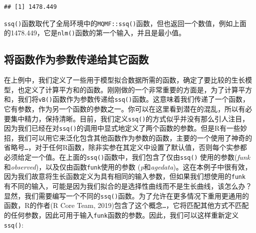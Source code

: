 \documentclass[
  lang=cn,
  11pt,
  scheme=chinese,
  chinesefont=nofont,
  citestyle=gb7714-2015,
  bibstyle=gb7714-2015]{elegantbook}
\newenvironment{Shaded}{\begin{snugshade}}{\end{snugshade}}
\newcommand{\AttributeTok}[1]{\textcolor[rgb]{0.13,0.29,0.53}{#1}}
\newcommand{\CommentTok}[1]{\textcolor[rgb]{0.56,0.35,0.01}{\textit{#1}}}
\newcommand{\ConstantTok}[1]{\textcolor[rgb]{0.56,0.35,0.01}{#1}}
\newcommand{\DecValTok}[1]{\textcolor[rgb]{0.00,0.00,0.81}{#1}}
\newcommand{\FloatTok}[1]{\textcolor[rgb]{0.00,0.00,0.81}{#1}}
\newcommand{\FunctionTok}[1]{\textcolor[rgb]{0.13,0.29,0.53}{\textbf{#1}}}
\newcommand{\NormalTok}[1]{#1}
\newcommand{\OtherTok}[1]{\textcolor[rgb]{0.56,0.35,0.01}{#1}}
\newcommand{\SpecialCharTok}[1]{\textcolor[rgb]{0.81,0.36,0.00}{\textbf{#1}}}
\newcommand{\StringTok}[1]{\textcolor[rgb]{0.31,0.60,0.02}{#1}}
\begin{document}
\begin{Shaded}
\end{Shaded}

\begin{verbatim}
## [1] 1478.449
\end{verbatim}

\texttt{ssq()}函数取代了全局环境中的\texttt{MQMF::ssq()}函数，但也返回一个数值，例如上面的1478.449，它是\texttt{nlm()}函数的第一个输入，并且是最小值。

\subsection{将函数作为参数传递给其它函数}\label{ux5c06ux51fdux6570ux4f5cux4e3aux53c2ux6570ux4f20ux9012ux7ed9ux5176ux5b83ux51fdux6570}

在上例中，我们定义了一些用于模型拟合数据所需的函数，确定了要比较的生长模型，也定义了计算平方和的函数。刚刚做的一个非常重要的方面是，为了计算平方和，我们将\texttt{vB()}函数作为参数传递给\texttt{ssq()}函数。这意味着我们传递了一个函数，它有参数，作为另一个函数的参数之一。你可以在这里看到潜在的混乱，所以有必要集中精力，保持清晰。目前，我们定义\texttt{ssq()}的方式似乎并没有那么引人注目，因为我们已经在对\texttt{ssq()}的调用中显式地定义了两个函数的参数。但是R有一些妙招，我们可以用它来泛化包含其他函数作为参数的函数，主要的一个使用了神奇的省略号\texttt{…}，对于任何R函数，除非实参在其定义中设置了默认值，否则每个实参都必须给定一个值。在上面的\texttt{ssq()}函数中，我们包含了仅由\texttt{ssq()} 使用的参数(\emph{funk}和\emph{observed})，以及仅由函数\texttt{funk}使用的参数 (\emph{p}和\emph{agedata})。这在本例子中很有效，因为我们故意将生长函数定义为具有相同的输入参数，但如果我们想使用的\texttt{funk}有不同的输入，可能是因为我们拟合的是选择性曲线而不是生长曲线，该怎么办？显然，我们需要编写一个不同的\texttt{ssq()}函数。为了允许在更多情况下重用更通用的函数，R的作者(R Core Team, 2019)包含了这个概念\texttt{…}，它将匹配其他方式不匹配的任何参数，因此可用于输入\texttt{funk}函数的参数。因此，我们可以这样重新定义\texttt{ssq()}:
\end{document}
